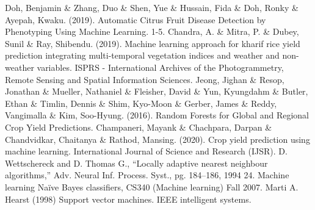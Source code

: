 \documentclass[12pt]{article}
\begin{document}
\begin{thebibliography}{9}
	Doh, Benjamin \& Zhang, Duo \& Shen, Yue \& Hussain, Fida \& Doh, Ronky \& Ayepah, Kwaku. (2019). Automatic Citrus Fruit Disease Detection by Phenotyping Using Machine Learning. 1-5. 
	Chandra, A. \& Mitra, P. \& Dubey, Sunil \& Ray, Shibendu. (2019). Machine learning approach for kharif  rice yield prediction integrating multi-temporal vegetation indices and weather and non-weather variables. ISPRS - International Archives of the Photogrammetry, Remote Sensing and Spatial Information Sciences. 
	Jeong, Jighan \& Resop, Jonathan \& Mueller, Nathaniel \& Fleisher, David \& Yun, Kyungdahm \& Butler, Ethan \& Timlin, Dennis \& Shim, Kyo-Moon \& Gerber, James \& Reddy, Vangimalla \& Kim, Soo-Hyung. (2016). Random Forests for Global and Regional Crop Yield Predictions.
	Champaneri, Mayank \& Chachpara, Darpan \& Chandvidkar, Chaitanya \& Rathod, Mansing. (2020). Crop yield prediction using machine learning. International Journal of Science and Research (IJSR).
	D. Wettschereck and D. Thomas G., “Locally adaptive nearest neighbour algorithms,” Adv. Neural Inf. Process. Syst., pg. 184–186, 1994
	24.	Machine learning Naïve Bayes classifiers, CS340 (Machine learning) Fall 2007. 
	Marti A. Hearst (1998) Support vector machines. IEEE intelligent systems.


		

	\end{thebibliography}
	
	
\end{document}
